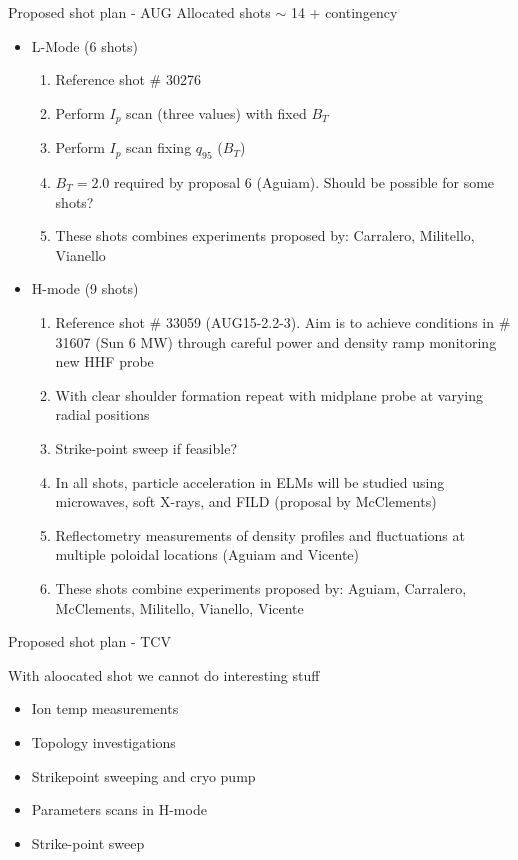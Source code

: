 \documentclass[10pt, compress]{beamer}
\begin{document}
\begin{frame}{Proposed shot plan - AUG}
\vspace{-1cm}
Allocated shots $\sim$ 14 + contingency 
\begin{itemize}
	\item L-Mode (6 shots)
	\begin{enumerate}
		\item Reference shot \# 30276
		\item Perform $I_p$ scan (three values) with fixed $B_T$
		\item Perform $I_p$ scan fixing  $q_{95}$	 ($B_T$)	
		\item $B_T= 2.0$ required by proposal 6 (Aguiam). Should be possible for some shots? 		
		\item These shots combines experiments proposed by: Carralero, Militello, 	Vianello 

	\end{enumerate}
	\item H-mode (9 shots)
	\begin{enumerate}
		\item Reference shot \# 33059 (AUG15-2.2-3). Aim is to achieve conditions in \# 31607 (Sun 6 MW) through careful power and density ramp monitoring new HHF probe 
		\item With clear shoulder formation repeat with midplane probe at varying radial positions 
		\item Strike-point sweep if feasible? 
		\item In all shots, particle acceleration in ELMs will be studied using microwaves, soft X-rays, and FILD (proposal by McClements) 
		\item Reflectometry measurements of density profiles and fluctuations at multiple poloidal locations (Aguiam and Vicente)
		\item These shots combine experiments proposed by: Aguiam, Carralero, McClements, Militello, Vianello, Vicente 
		
	\end{enumerate}
\end{itemize}
\end{frame}

\begin{frame}{Proposed shot plan - TCV}

\end{frame}

\begin{frame}{With aloocated shot we cannot do interesting stuff }
\begin{itemize}
	\item Ion temp measurements
	\item Topology investigations
	\item Strikepoint sweeping and cryo pump
	\item Parameters scans in H-mode
	\item Strike-point sweep

\end{itemize}
\end{frame}
\end{document}
